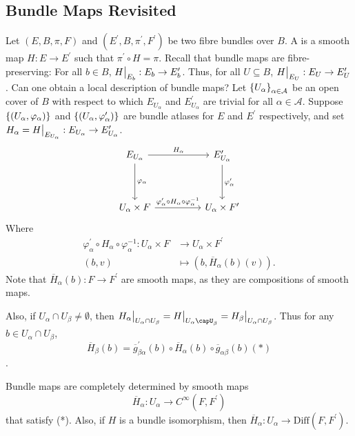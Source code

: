 \documentclass[main.tex]{subfiles}
\begin{document}
\subsection{Bundle Maps Revisited}

Let $(E, B, \pi, F)$ and $(E^\prime, B, \pi^\prime, F^\prime)$ be two fibre bundles over $B$. A  is a smooth map $H : E \to E^\prime$ such that $\pi^\prime \circ H = \pi$. Recall that bundle maps are fibre-preserving: For all $b \in B$, $H\big|_{E_b}: E_b \to E_b^\prime$. Thus, for all $U \subseteq B$, $H \big|_{E_U}: E_U \to E^\prime_U$. Can one obtain a local description of bundle maps? Let $\left\{ U_\alpha\right\}_{\alpha \in \mathcal{A}}$ be an open cover of $B$ with respect to which $E_{U_\alpha}$ and $E^\prime_{U_\alpha}$ are trivial for all $\alpha \in \mathcal{A}$. Suppose $\left\{\left( U_\alpha, \varphi_\alpha \right)\right\}$ and $\left\{\left( U_\alpha, \varphi^\prime_\alpha  \right)\right\}$ are bundle atlases for $E$ and $E^\prime$ respectively, and set $H_\alpha = H\big|_{E_{U_\alpha}} : E_{U_\alpha} \to E^\prime_{U_\alpha}$.
\[
\begin{tikzcd}
E_{U_\alpha} \arrow[rr, "H_\alpha"] \arrow[dd, "\varphi_\alpha"]                              &  & E^\prime_{U_\alpha} \arrow[dd, "\varphi^\prime_\alpha"] \\
                                                                                              &  &                                                         \\
U_\alpha\times F \arrow[rr, "\varphi_\alpha^\prime \circ H_\alpha \circ \varphi_\alpha^{-1}"] &  & U_\alpha\times F^\prime
\end{tikzcd}
\]
Where
\begin{align*}
    \varphi^\prime_\alpha \circ H_\alpha \circ \varphi_\alpha^{-1} : U_\alpha \times F &\to U_\alpha \times F^\prime \\
    (b, v) &\mapsto (b, \overline{H}_\alpha(b)(v)).
\end{align*}
Note that $\overline{H}_\alpha(b): F \to F^\prime$ are smooth maps, as they are compositions of smooth maps.

Also, if $U_\alpha\cap U_\beta \neq \emptyset$, then $H_\alpha\rst{U_\alpha \cap U_\beta} = H\rst{U_\alpha\capU_\beta} = H_\beta\rst{U_\alpha \cap U_\beta}$. Thus for any $b \in U_\alpha \cap U_\beta$, \[\overline{H}_\beta(b) = \overline{g}^\prime_{\beta\alpha}(b) \circ \overline{H}_\alpha(b) \circ \overline{g}_{\alpha\beta}(b) (*)\].

Bundle maps are completely determined by smooth maps
\[
\overline{H}_\alpha : U_\alpha \to C^\infty(F, F^\prime)
\]
that satisfy (*). Also, if $H$ is a bundle isomorphism, then $\overline{H}_\alpha : U_\alpha \to \text{Diff}(F, F^\prime)$.
\end{document}
